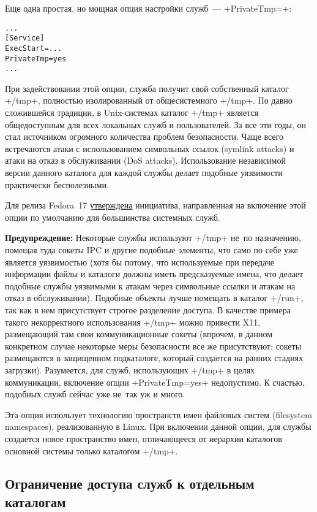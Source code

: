 \documentclass[10pt,oneside,a4paper]{article}
\newenvironment{caveat}[1][]{\smallskip\par\textbf{Предупреждение#1: }}%
	{\smallskip\par}
\begin{document}
Еще одна простая, но мощная опция настройки служб~--- +PrivateTmp=+:
\begin{Verbatim}
...
[Service]
ExecStart=...
PrivateTmp=yes
...
\end{Verbatim}
При задействовании этой опции, служба получит свой собственный каталог +/tmp+,
полностью изолированный от общесистемного +/tmp+. По давно сложившейся традиции,
в Unix-системах каталог +/tmp+ является общедоступным для всех локальных служб и
пользователей. За все эти годы, он стал источником огромного количества проблем
безопасности. Чаще всего встречаются атаки с использованием символьных ссылок
(symlink attacks) и атаки на отказ в обслуживании (DoS attacks). Использование 
независимой версии данного каталога для каждой службы делает подобные уязвимости
практически бесполезными.

Для релиза Fedora~17
\href{https://fedoraproject.org/wiki/Features/ServicesPrivateTmp}{утверждена}
инициатива, направленная на включение этой опции по умолчанию для большинства
системных служб.

\begin{caveat}
Некоторые службы используют +/tmp+ не~по назначению,
помещая туда сокеты IPC и другие подобные элементы, что само по себе уже
является уязвимостью (хотя бы потому, что используемые при передаче информации
файлы и каталоги должны иметь предсказуемые имена, что делает подобные службы
уязвимыми к атакам через символьные ссылки и атакам на отказ в обслуживании).
Подобные объекты лучше помещать в каталог +/run+, так как в нем присутствует
строгое разделение доступа. В качестве примера такого некорректного
использования +/tmp+ можно привести X11, размещающий там свои коммуникационные
сокеты (впрочем, в данном конкретном случае некоторые меры безопасности все же
присутствуют: сокеты размещаются в защищенном подкаталоге, который создается на
ранних стадиях загрузки). Разумеется, для служб, использующих +/tmp+ в целях
коммуникации, включение опции +PrivateTmp=yes+ недопустимо. К счастью, подобных
служб сейчас уже не~так уж и много.
\end{caveat}

Эта опция использует технологию пространств имен файловых систем (filesystem
namespaces), реализованную в Linux. При включении данной опции, для службы
создается новое пространство имен, отличающееся от иерархии каталогов основной
системы только каталогом +/tmp+.

\subsection{Ограничение доступа служб к отдельным каталогам}
\end{document}
